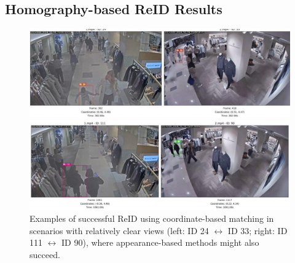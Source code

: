 \documentclass[12pt, a4paper]{article}
\begin{document}
\subsection{Homography-based ReID Results}


\begin{figure}[H]
    \centering
    \begin{minipage}{0.48\linewidth}
        \centering
        \includegraphics[width=\linewidth]{pictures/demo_reid1.jpeg} %
    \end{minipage}
    \hfill %
    \begin{minipage}{0.48\linewidth}
        \centering
        \includegraphics[width=\linewidth]{pictures/demo_reid3.jpeg} %
    \end{minipage}
    \caption{Examples of successful ReID using coordinate-based matching in scenarios with relatively clear views (left: ID 24 $\leftrightarrow$ ID 33; right: ID 111 $\leftrightarrow$ ID 90), where appearance-based methods might also succeed.}
    \label{fig:reid_demos_good_appearance}
\end{figure}
\end{document}

